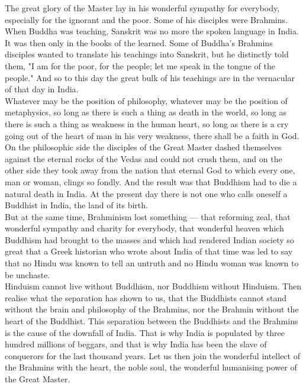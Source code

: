 The great glory of the Master lay in his wonderful sympathy
for everybody, especially for the ignorant and the poor. Some of his
disciples were Brahmins. When Buddha was teaching, Sanskrit was no more
the spoken language in India. It was then only in the books of the
learned. Some of Buddha's Brahmins disciples wanted to translate his
teachings into Sanskrit, but he distinctly told them, "I am for the
poor, for the people; let me speak in the tongue of the people." And so
to this day the great bulk of his teachings are in the vernacular of
that day in India.\\

Whatever may be the position of philosophy, whatever may be
the position of metaphysics, so long as there is such a thing as death
in the world, so long as there is such a thing as weakness in the human
heart, so long as there is a cry going out of the heart of man in his
very weakness, there shall be a faith in God.\\

On the philosophic side the disciples of the Great Master
dashed themselves against the eternal rocks of the Vedas and could not
crush them, and on the other side they took away from the nation that
eternal God to which every one, man or woman, clings so fondly. And the
result was that Buddhism had to die a natural death in India. At the
present day there is not one who calls oneself a Buddhist in India, the
land of its birth.\\

But at the same time, Brahminism lost something — that
reforming zeal, that wonderful sympathy and charity for everybody, that
wonderful heaven which Buddhism had brought to the masses and which had
rendered Indian society so great that a Greek historian who wrote about
India of that time was led to say that no Hindu was known to tell an
untruth and no Hindu woman was known to be unchaste.\\

Hinduism cannot live without Buddhism, nor Buddhism without
Hinduism. Then realise what the separation has shown to us, that the
Buddhists cannot stand without the brain and philosophy of the
Brahmins, nor the Brahmin without the heart of the Buddhist. This
separation between the Buddhists and the Brahmins is the cause of the
downfall of India. That is why India is populated by three hundred
millions of beggars, and that is why India has been the slave of
conquerors for the last thousand years. Let us then join the wonderful
intellect of the Brahmins with the heart, the noble soul, the wonderful
humanising power of the Great Master.\\

